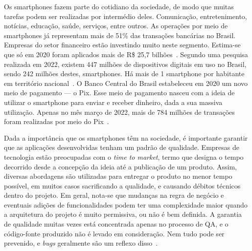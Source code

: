 Os smartphones fazem parte do cotidiano da sociedade, de modo que muitas tarefas podem ser realizadas por intermédio deles.
Comunicação, entretenimento, notícias, educação, saúde, serviços, entre outros.
As operações por meio de smartphones já representam mais de 51\% das transações bancárias no Brasil.
Empresas do setor financeiro estão investindo muito neste segmento.
Estima-se que só em 2020 foram aplicados mais de R\$ 25,7 bilhões~\cite{febraban-data}.
Segundo uma pesquisa realizada em 2022, existem 447 milhões de dispositivos digitais em uso no Brasil, sendo 242 milhões destes, smartphones.
Há mais de 1 smartphone por habitante em território nacional~\cite{it-usage-data}.
O Banco Central do Brasil estabeleceu em 2020 um novo meio de pagamento — o Pix.
Esse meio de pagamento nasceu com a ideia de utilizar o smartphone para enviar e receber dinheiro, dada a sua massiva utilização.
Apenas no mês março de 2022, mais de 784 milhões de transações foram realizadas por meio do Pix~\cite{pix-statistics}.

Dada a importância que os smartphones têm na sociedade, é importante garantir que as aplicações desenvolvidas tenham um padrão de qualidade.
Empresas de tecnologia estão preocupadas com o \emph{time to market}, termo que designa o tempo decorrido desde a concepção da ideia até a publicação de um produto.
Assim, diversas abordagens são utilizadas para entregar o produto no menor tempo possível, em muitos casos sacrificando a qualidade, e causando débitos técnicos dentro do projeto.
Em geral, nota-se que mudanças na regra de negócio e eventuais adições de funcionalidades podem ter uma complexidade maior quando a arquitetura do projeto é muito permissiva, ou não é bem definida.
A garantia de qualidade muitas vezes está concentrada apenas no processo de QA, e o código-fonte produzido não é levado em consideração.
Nem tudo pode ser prevenido, e \emph{bugs} geralmente são um reflexo disso~\cite{quality-standards-paper}.